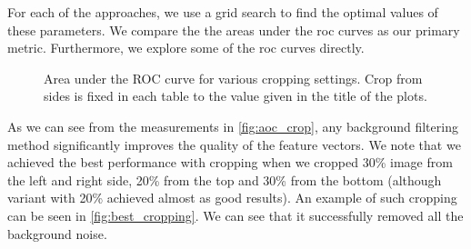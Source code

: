 For each of the approaches, we use a grid search to find the optimal values of
these parameters. We compare the the
areas under the \gls{roc} curves as our primary metric. Furthermore, we explore some of the
\gls{roc} curves directly.
\begin{figure}
    \centering
    \def\svgwidth{\columnwidth}
    \Large
    \scalebox{0.6}{}
    \scalebox{0.6}{}
    \scalebox{0.6}{}
    \caption[Area under the ROC curve for various cropping settings]{Area under the ROC curve for various cropping settings. Crop from sides is fixed in each table to the value given in the title of the plots.}
    \label{fig:aoc_crop}
\end{figure}

As we can see from the measurements in \autoref{fig:aoc_crop}, any background filtering method significantly improves the quality of the feature vectors. We note that we achieved the best performance with cropping when we 
cropped 30\% image from the left and right side, 20\% from the top and 30\%
from the bottom (although variant with 20\% achieved almost as good results). An example of such cropping can be seen in
\autoref{fig:best_cropping}. We can see that it successfully removed all the background noise.

